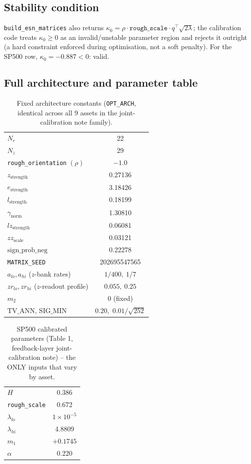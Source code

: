 \documentclass[11pt]{article}
\begin{document}
\subsection{Stability condition}
\label{sec:stability}
\texttt{build\_esn\_matrices} also returns
$\kappa_0=\rho\cdot\texttt{rough\_scale}\cdot q^\top\sqrt{2\lambda}$;
the calibration code treats $\kappa_0\ge0$ as an invalid/unstable
parameter region and rejects it outright (a hard constraint enforced
during optimisation, not a soft penalty). For the SP500 row,
$\kappa_0=-0.887<0$: valid.

\subsection{Full architecture and parameter table}
\label{sec:params}
\begin{table}[h]
\centering
\caption{Fixed architecture constants (\texttt{OPT\_ARCH}, identical
across all 9 assets in the joint-calibration note family).}
\label{tab:arch}
\begin{tabular}{lc}
\toprule
$N_r$ & 22 \\
$N_z$ & 29 \\
\texttt{rough\_orientation} $(\rho)$ & $-1.0$ \\
$z_{\text{strength}}$ & 0.27136 \\
$e_{\text{strength}}$ & 3.18426 \\
$l_{\text{strength}}$ & 0.18199 \\
$\gamma_{\text{norm}}$ & 1.30810 \\
$lz_{\text{strength}}$ & 0.06081 \\
$zz_{\text{scale}}$ & 0.03121 \\
$\mathrm{sign\_prob\_neg}$ & 0.22278 \\
\texttt{MATRIX\_SEED} & 202695547565 \\
\midrule
$a_{lo},a_{hi}$ ($z$-bank rates) & $1/400,\ 1/7$ \\
$zr_{lo},zr_{hi}$ ($z$-readout profile) & $0.055,\ 0.25$ \\
$m_2$ & 0 (fixed) \\
$\text{TV\_ANN}$, $\text{SIG\_MIN}$ & $0.20$,\ $0.01/\sqrt{252}$ \\
\bottomrule
\end{tabular}
\end{table}

\begin{table}[h]
\centering
\caption{SP500 calibrated parameters (Table 1, feedback-layer
joint-calibration note) -- the ONLY inputs that vary by asset.}
\label{tab:sp500}
\begin{tabular}{lc}
\toprule
$H$ & 0.386 \\
\texttt{rough\_scale} & 0.672 \\
$\lambda_{lo}$ & $1\times10^{-5}$ \\
$\lambda_{hi}$ & 4.8809 \\
$m_1$ & $+0.1745$ \\
$\alpha$ & 0.220 \\
\bottomrule
\end{tabular}
\end{table}
\end{document}

